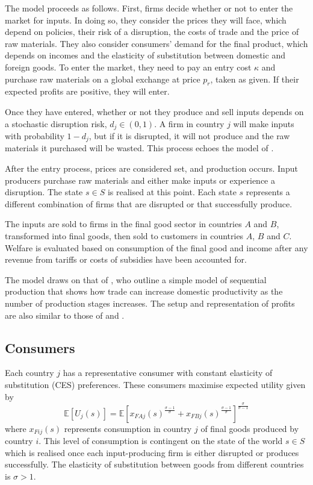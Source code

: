 \documentclass{article}
\begin{document}
The model proceeds as follows. First, firms decide whether or not to enter the market for inputs. In doing so, they consider the prices they will face, which depend on policies, their risk of a disruption, the costs of trade and the price of raw materials. They also consider consumers' demand for the final product, which depends on incomes and the elasticity of substitution between domestic and foreign goods. To enter the market, they need to pay an entry cost $\kappa$ and purchase raw materials on a global exchange at price $p_r$, taken as given. If their expected profits are positive, they will enter.

Once they have entered, whether or not they produce and sell inputs depends on a stochastic disruption risk, $d_j \in (0, 1)$. A firm in country $j$ will make inputs with probability $1 - d_j$, but if it is disrupted, it will not produce and the raw materials it purchased will be wasted. This process echoes the model of \textcite{bimpikis_supply_2019}.

After the entry process, prices are considered set, and production occurs. Input producers purchase raw materials and either make inputs or experience a disruption. The state $s \in S$ is realised at this point. Each state $s$ represents a different combination of firms that are disrupted or that successfully produce.

The inputs are sold to firms in the final good sector in countries $A$ and $B$, transformed into final goods, then sold to customers in countries $A$, $B$ and $C$. Welfare is evaluated based on consumption of the final good and income after any revenue from tariffs or costs of subsidies have been accounted for.

The model draws on that of \textcite{melitz_missing_2014}, who outline a simple model of sequential production that shows how trade can increase domestic productivity as the number of production stages increases. The setup and representation of profits are also similar to those of \textcite{venables_trade_1987} and \textcite{bagwell_design_2016}.

\subsection{Consumers}
 
Each country $j$ has a representative consumer with constant elasticity of substitution (CES) preferences. These consumers maximise expected utility given by
\begin{equation}
    \mathbb{E} \left[ U_j(s) \right] = \mathbb{E} \left[ x_{FAj}(s)^{\frac{\sigma - 1}{\sigma}} + x_{FBj}(s)^{\frac{\sigma - 1}{\sigma}} \right]^{\frac{\sigma}{\sigma - 1}}
\end{equation}
where $x_{Fij}(s)$ represents consumption in country $j$ of final goods produced by country $i$. This level of consumption is contingent on the state of the world $s \in S$ which is realised once each input-producing firm is either disrupted or produces successfully. The elasticity of substitution between goods from different countries is $\sigma > 1$. 
\end{document}
